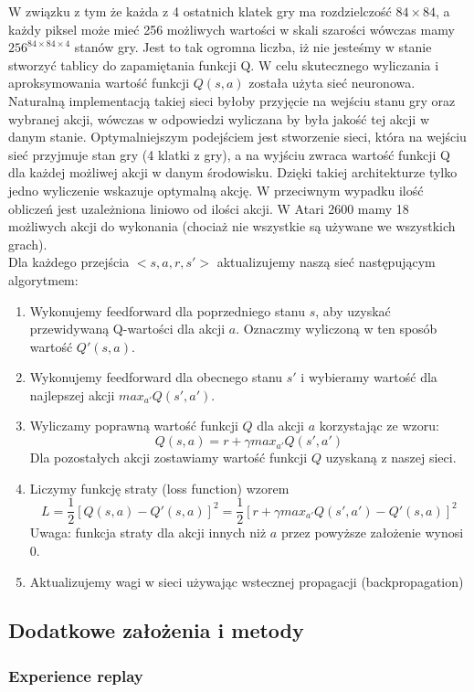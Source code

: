 \documentclass[12pt]{article}
\begin{document}
W związku z tym że każda z 4 ostatnich klatek gry ma rozdzielczość $84\times 84$, a każdy piksel może mieć 256 możliwych wartości w skali szarości wówczas mamy $256^{84\times84\times4}$ stanów gry. Jest to tak ogromna liczba, iż nie jesteśmy w stanie stworzyć tablicy do zapamiętania funkcji Q.
W celu skutecznego wyliczania i aproksymowania wartość funkcji $Q(s,a)$ została użyta sieć neuronowa. Naturalną implementacją takiej sieci byłoby przyjęcie na wejściu stanu gry oraz wybranej akcji, wówczas w odpowiedzi wyliczana by była jakość tej akcji w danym stanie. Optymalniejszym podejściem jest stworzenie sieci, która na wejściu sieć przyjmuje stan gry (4 klatki z gry), a na wyjściu zwraca wartość funkcji Q dla każdej możliwej akcji w danym środowisku. Dzięki takiej architekturze tylko jedno wyliczenie wskazuje optymalną akcję. W przeciwnym wypadku ilość obliczeń jest uzależniona liniowo od ilości akcji. W Atari 2600 mamy 18 możliwych akcji do wykonania (chociaż nie wszystkie są używane we wszystkich grach).
\\
Dla każdego przejścia $<s, a, r, s'>$ aktualizujemy naszą sieć następującym algorytmem:
\begin{enumerate}
\item Wykonujemy feedforward dla poprzedniego stanu $s$, aby uzyskać przewidywaną Q-wartości dla akcji $a$. Oznaczmy wyliczoną w ten sposób wartość $Q'(s,a)$.
\item Wykonujemy feedforward dla obecnego stanu $s'$ i wybieramy wartość dla najlepszej akcji $max_{a'}Q(s',a')$.
\item Wyliczamy poprawną wartość funkcji $Q$ dla akcji $a$ korzystając ze wzoru: $$Q(s, a) = r + \gamma max_{a'}Q(s',a')$$ Dla pozostałych akcji zostawiamy wartość funkcji $Q$ uzyskaną z naszej sieci.
\item Liczymy funkcję straty (loss function) wzorem $$L=\frac{1}{2}[Q(s,a)-Q'(s,a)]^2=\frac{1}{2}[r+\gamma max_{a'}Q(s',a')-Q'(s,a)]^2$$ Uwaga: funkcja straty dla akcji innych niż $a$ przez powyższe założenie wynosi 0. 
\item Aktualizujemy wagi w sieci używając wstecznej propagacji (backpropagation)
\end{enumerate}

\subsection{Dodatkowe założenia i metody}

\subsubsection{Experience replay}
\end{document}

